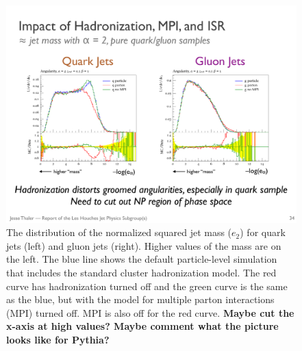 \begin{figure}[h!]
\begin{center}
\includegraphics[width = 0.99\columnwidth]{figures/robustness.pdf}
\end{center}
\caption{The distribution of the normalized squared jet mass ($e_2$) for quark jets (left) and gluon jets (right).  Higher values of the mass are on the left.  The blue line shows the default particle-level simulation that includes the standard cluster hadronization model.  The red curve has hadronization turned off and the green curve is the same as the blue, but with the \herwig model for multiple parton interactions (MPI) turned off.  MPI is also off for the red curve.  \textbf{Maybe cut the x-axis at high values?  Maybe comment what the picture looks like for Pythia?}}
\label{fig:robustness}
\end{figure}


